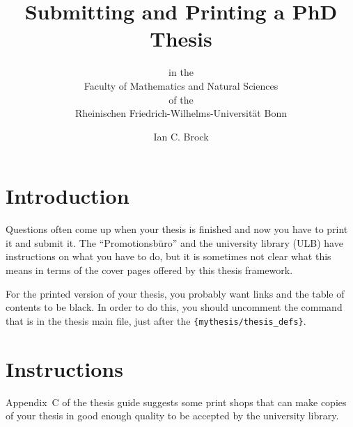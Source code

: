 \documentclass[a4paper,twoside,ngerman,UKenglish]{scrartcl}
\begin{document}
\title{Submitting and Printing a PhD Thesis}
\subtitle{\vspace*{4ex}
    in the\\
    Faculty of Mathematics and Natural Sciences\\
    of the\\
    Rheinischen Friedrich-Wilhelms-Universität Bonn
}
\author{Ian C. Brock}
\maketitle

\section{Introduction}
Questions often come up when your thesis is finished and now you have
to print it and submit it. The \foreignquote{ngerman}{Promotionsbüro}
and the university library (ULB) have instructions on what you have to
do, but it is sometimes not clear what this means in terms of the
cover pages offered by this thesis framework.

For the printed version of your thesis, you probably want
 links and the table of contents to be black. In
order to do this, you should uncomment the  command
that is in the thesis main file, just after the
\texttt{\{mythesis/thesis\_defs\}}.

\section{Instructions}


Appendix~C of the thesis guide suggests some print
shops that can make copies of your thesis in good enough quality to be
accepted by the university library.
\end{document}
